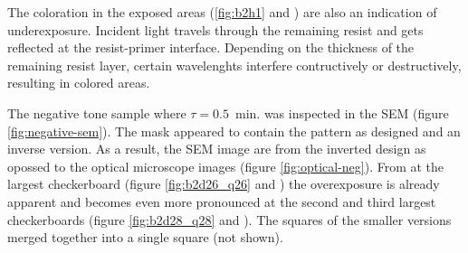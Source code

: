 The coloration in the exposed areas (\ref{fig:b2h1} and ) are also an indication of underexposure. Incident light travels through the remaining resist and gets reflected at the resist-primer interface. Depending on the thickness of the remaining resist layer, certain wavelenghts interfere contructively or destructively, resulting in colored areas. 

The negative tone sample where $\tau = 0.5$~min. was inspected in the SEM (figure \ref{fig:negative-sem}). The mask appeared to contain the pattern as designed and an inverse version. As a result, the SEM image are from the inverted design as opossed to the optical microscope images (figure \ref{fig:optical-neg}). From at the largest checkerboard (figure \ref{fig:b2d26_q26} and ) the overexposure is already apparent and becomes even more pronounced at the second and third largest checkerboards (figure \ref{fig:b2d28_q28} and ). The squares of the smaller versions merged together into a single square (not shown).


